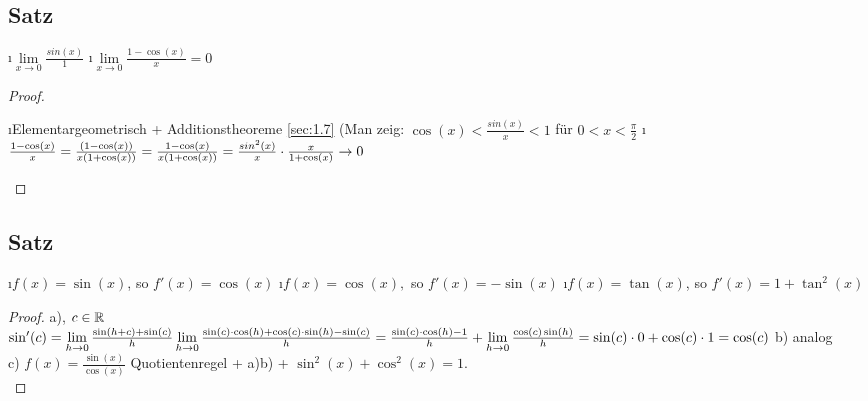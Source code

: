 \subsection[Satz]{Satz}\label{sec:6.7}
\begin{enumerate}[a)]
\i $\lim\limits_{x \to 0} \frac{sin(x)}{1}$
\i $\lim\limits_{x \to 0} \frac{1-\cos(x)}{x} = 0$
\end{enumerate}
\begin{proof}\ \\
\begin{enumerate}[a)]
\i Elementargeometrisch + Additionstheoreme \ref{sec:1.7}
(Man zeig: $\cos(x) < \frac{sin(x)}{x} < 1$ für $0 < x < \frac{\pi}{2}$
\i $\frac{1-\cos(x)}{x} = \frac{(1-\cos(x))}{x(1+\cos(x))} = \frac{1-\cos(x)}{x(1 + \cos(x))} = \frac{sin^2(x)}{x} \cdot \frac{x}{1 + \cos(x)} \to 0$
\end{enumerate}
\end{proof}
\subsection[Satz: Ableitungsregeln von cosinus und sinus]{Satz}
\begin{enumerate}[a)]
\i $f(x) = \sin(x)$, so $f'(x) = \cos(x)$
\i $f(x) = \cos(x),$ so $f'(x) = -\sin(x)$
\i $f(x) = \tan(x)$, so $f'(x) = 1 + \tan^2(x)$
\end{enumerate}
\begin{proof}
a), $c \in \mathbb{R}$\\
$\sin'(c) = \lim\limits_{h \to 0}\frac{\sin(h+c) + \sin(c)}{h}\\
\lim\limits_{h \to 0} \frac{\sin(c) \cdot \cos(h) + \cos(c) \cdot \sin(h) - \sin(c)}{h}\\
= \frac{\sin(c) \cdot \cos(h) -1}{h} + \lim\limits_{h \to 0} \frac{\cos(c)\sin(h)}{h} = \sin(c) \cdot 0 + \cos(c) \cdot 1 = \cos(c)$
b) analog\\
c) $f(x) = \frac{\sin(x)}{\cos(x)}$ Quotientenregel + a)b) + $\sin^2(x) + \cos^2(x) =1$.\\
\end{proof}
